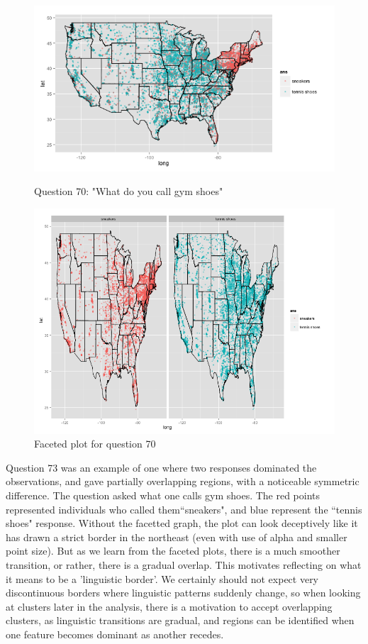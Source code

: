 \documentclass{article}\usepackage[]{graphicx}\usepackage[]{color}
\begin{document}
\begin{figure}[H]
\begin{minipage}{.30\textwidth}
\vspace{7pts}
\includegraphics[width=220pts, height=125pts]{shoes.png}
\caption{Question 70: "What do you call gym shoes"}
\end{minipage}
\begin{minipage}{.60\textwidth}
\includegraphics[width=400pts, height=120pts]{shoes_facet.png}
\vspace{-10pts}
\caption{Faceted plot for question 70}
\end{minipage}
\end{figure}

Question 73 was an example of one where two responses dominated the observations, and gave partially overlapping regions, with a noticeable symmetric difference.  The question asked what one calls gym shoes. The red points represented individuals who called them``sneakers", and blue represent the ``tennis shoes" response.  Without the facetted graph, the plot can look deceptively like it has drawn a strict border in the northeast (even with use of alpha and smaller point size).  But as we learn from the faceted plots, there is a much smoother transition, or rather, there is a gradual overlap.  This motivates reflecting on what it means to be a 'linguistic border'.  We certainly should not expect very discontinuous borders where linguistic patterns suddenly change, so when looking at clusters later in the analysis, there is a motivation to accept overlapping clusters, as linguistic transitions are gradual, and regions can be identified when one feature becomes dominant as another recedes.  
\end{document}
